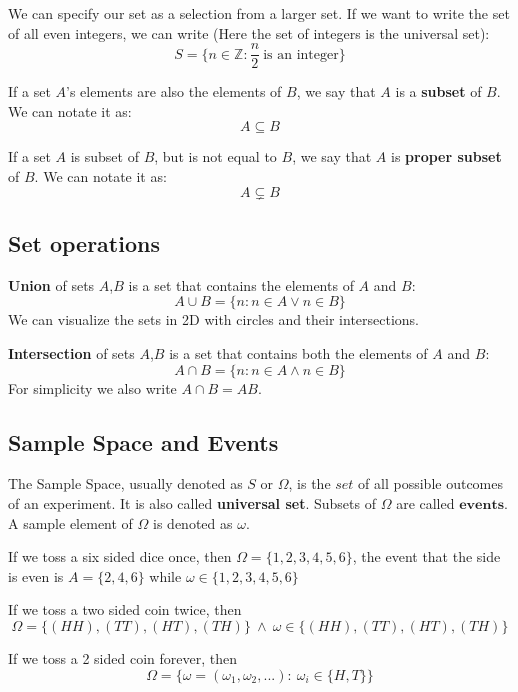 We can specify our set  as a selection from a larger set. If we want to write the set of all even integers, we can write (Here the set of integers is the universal set):
$$ S = \{n \in \mathbb{Z}: \frac{n}{2} \ \text{is an integer} \}$$
\par 
If a set $A$'s elements are also the elements of $B$, we say that $A$ is a \textbf{subset} of $B$. We can notate it as:
$$ A \subseteq B $$
\par
If a set $A$ is subset of $B$, but is not equal to $B$, we say that $A$ is \textbf{proper subset} of $B$. We can notate it as:
$$A \subsetneq B$$

\subsection*{Set operations}
\textbf{Union} of sets $A$,$B$ is a set that contains the elements of $A$ and $B$:
$$A \cup B = \{n:n \in A  \lor  n  \in B\}$$
We can visualize the sets in 2D with circles and their intersections.  











\textbf{Intersection} of sets $A$,$B$ is a set that contains both the elements of $A$ and $B$:
$$A \cap B = \{n:n \in A  \land  n  \in B\}$$
For simplicity we also write $A \cap B = AB$.


\par






\subsection*{Sample Space and Events}
The Sample Space, usually denoted as $S$ or $\Omega$, is the $\textit{set}$ of all possible outcomes of an experiment. It is also called  \textbf{universal set}. Subsets of $\Omega$ are called $\textbf{events}$. A sample element of $\Omega$ is denoted as $\omega$.

\begin{example}
    If we toss a six sided dice once, then $\Omega = \{1,2,3,4,5,6\}$, the event that the side is even is $A= \{2,4,6\}$ while $\omega \in \{1,2,3,4,5,6\}$
\end{example}

\begin{example}
    If we toss a two sided coin twice, then $$\Omega = \{(HH),(TT),(HT),(TH)\} \ \land \ \omega \in \{(HH),(TT),(HT),(TH)\}$$
\end{example}
\begin{example}
    If we toss a 2 sided coin forever, then $$\Omega = \{\omega= (\omega_1,\omega_2,...): \ \omega_i \in \{H,T\} \}$$
\end{example}

